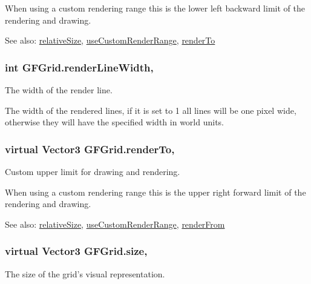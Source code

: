 When using a custom rendering range this is the lower left backward limit of the rendering and drawing.

See also\+: \hyperlink{class_g_f_grid_a65d207e3957240c935645db01a199419_a65d207e3957240c935645db01a199419}{relative\+Size}, \hyperlink{class_g_f_grid_acb950aa31097c85e153cd9a642900a31_acb950aa31097c85e153cd9a642900a31}{use\+Custom\+Render\+Range}, \hyperlink{class_g_f_grid_af9ec4b040505718f58a7841087d9b72a_af9ec4b040505718f58a7841087d9b72a}{render\+To} \hypertarget{class_g_f_grid_a6712a2e6fec379ea55a0a53ca5867216_a6712a2e6fec379ea55a0a53ca5867216}{
\subsubsection[{render\+Line\+Width}]{\setlength{\rightskip}{0pt plus 5cm}int G\+F\+Grid.\+render\+Line\+Width\hspace{0.3cm}{\ttfamily [get]}, {\ttfamily [set]}}}\label{class_g_f_grid_a6712a2e6fec379ea55a0a53ca5867216_a6712a2e6fec379ea55a0a53ca5867216}
The width of the render line.

The width of the rendered lines, if it is set to 1 all lines will be one pixel wide, otherwise they will have the specified width in world units. \hypertarget{class_g_f_grid_af9ec4b040505718f58a7841087d9b72a_af9ec4b040505718f58a7841087d9b72a}{
\subsubsection[{render\+To}]{\setlength{\rightskip}{0pt plus 5cm}virtual Vector3 G\+F\+Grid.\+render\+To\hspace{0.3cm}{\ttfamily [get]}, {\ttfamily [set]}}}\label{class_g_f_grid_af9ec4b040505718f58a7841087d9b72a_af9ec4b040505718f58a7841087d9b72a}
Custom upper limit for drawing and rendering.

When using a custom rendering range this is the upper right forward limit of the rendering and drawing.

See also\+: \hyperlink{class_g_f_grid_a65d207e3957240c935645db01a199419_a65d207e3957240c935645db01a199419}{relative\+Size}, \hyperlink{class_g_f_grid_acb950aa31097c85e153cd9a642900a31_acb950aa31097c85e153cd9a642900a31}{use\+Custom\+Render\+Range}, \hyperlink{class_g_f_grid_a4556eac3905975b9024addb169c629d8_a4556eac3905975b9024addb169c629d8}{render\+From} \hypertarget{class_g_f_grid_a336f54e5b5f677871876dc3d90cc611d_a336f54e5b5f677871876dc3d90cc611d}{
\subsubsection[{size}]{\setlength{\rightskip}{0pt plus 5cm}virtual Vector3 G\+F\+Grid.\+size\hspace{0.3cm}{\ttfamily [get]}, {\ttfamily [set]}}}\label{class_g_f_grid_a336f54e5b5f677871876dc3d90cc611d_a336f54e5b5f677871876dc3d90cc611d}
The size of the grid's visual representation.

